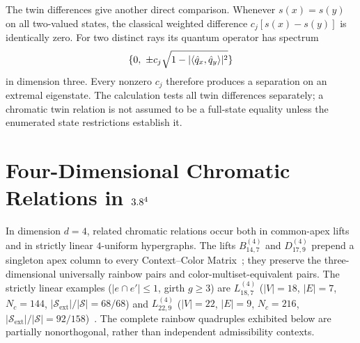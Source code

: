 \documentclass[aps,pra,reprint,superscriptaddress,longbibliography,nofootinbib,floatfix,10pt]{revtex4-2}
\theoremstyle{definition}\newtheorem{definition}[theorem]{Definition}
\theoremstyle{remark}\newtheorem{remark}[theorem]{Remark}
\newcommand{\Sc}{\mathcal S}\newcommand{\Cc}{\mathcal C}\newcommand{\Wc}{\mathcal W}
\begin{document}
The twin differences give another direct comparison. Whenever $s(x)=s(y)$ on all two-valued states, the classical weighted difference $c_j[s(x)-s(y)]$ is identically zero. For two distinct rays its quantum operator has spectrum
\begin{equation}\label{eq:classical-twin-difference-spectrum}
\{0,\ \pm c_j\sqrt{1-|\langle \hat q_x,\hat q_y\rangle|^2}\}
\end{equation}
in dimension three. Every nonzero $c_j$ therefore produces a separation on an extremal eigenstate. The calculation tests all twin differences separately; a chromatic twin relation is not assumed to be a full-state equality unless the enumerated state restrictions establish it.

\section{Four-Dimensional Chromatic Relations in \texorpdfstring{$3.8^4$}{R4}}\label{sec:4d}

In dimension $d=4$, related chromatic relations occur both in common-apex lifts and in strictly linear $4$-uniform hypergraphs. The lifts $B_{14,7}^{(4)}$ and $D_{17,9}^{(4)}$ prepend a singleton apex column to every Context--Color Matrix~\cite[Proposition~2]{2026-latin-context-matrix}; they preserve the three-dimensional universally rainbow pairs and color-multiset-equivalent pairs. The strictly linear examples ($|e\cap e'|\le1$, girth $g\ge3$) are $L_{18,7}^{(4)}$ ($|V|=18$, $|E|=7$, $N_c=144$, $|\Sc_{\mathrm{ext}}|/|\Sc|=68/68$) and $L_{22,9}^{(4)}$ ($|V|=22$, $|E|=9$, $N_c=216$, $|\Sc_{\mathrm{ext}}|/|\Sc|=92/158$)~\cite{svozil2026contexts,2026-latin-context-matrix}. The complete rainbow quadruples exhibited below are partially nonorthogonal, rather than independent admissibility contexts.
\end{document}
